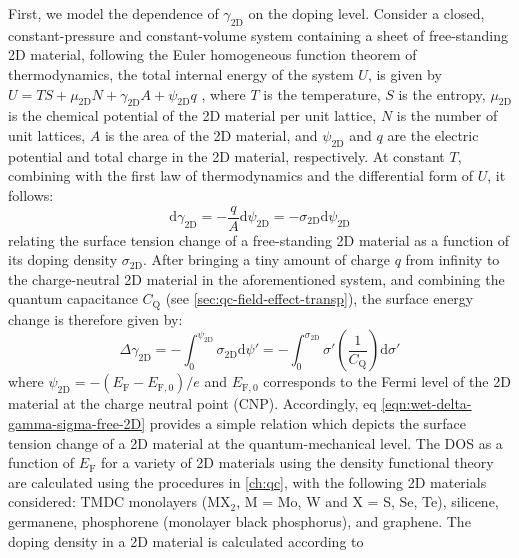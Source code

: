 First, we model the dependence of \(\gamma_{\mathrm{2D}}\) on the doping
level. Consider a closed, constant-pressure and constant-volume system
containing a sheet of free-standing 2D material, following the Euler
homogeneous function theorem of thermodynamics, the total internal
energy of the system \(U\), is given by \(U = TS + \mu_{\mathrm{2D}} N +
\gamma_{\mathrm{2D}} A + \psi_{\mathrm{2D}} q\)
\cite{Bard_1980_electrochem_book}, where \(T\) is the temperature, \(S\) is
the entropy, \(\mu_{\mathrm{2D}}\) is the chemical potential of the 2D
material per unit lattice, \(N\) is the number of unit lattices, \(A\) is
the area of the 2D material, and \(\psi_{\mathrm{2D}}\) and \(q\) are the
electric potential and total charge in the 2D material,
respectively. At constant \(T\), combining with the first law of
thermodynamics and the differential form of \(U\), it follows:
\begin{equation}
\label{eqn:wet-dgamma-dpsi}
\mathrm{d} \gamma_{\mathrm{2D}} = -\frac{q}{A} \mathrm{d} \psi_{\mathrm{2D}}
                                = -\sigma_{\mathrm{2D}} \mathrm{d} \psi_{\mathrm{2D}}
\end{equation}
relating the surface tension change of a free-standing 2D material as
a function of its doping density \(\sigma_{\mathrm{2D}}\).
%
After bringing a tiny amount of charge
\(q\) from infinity to the charge-neutral 2D material in the
aforementioned system, and combining the quantum capacitance $C_{\mathrm{Q}}$ (see \autoref{sec:qc-field-effect-transp}),
the surface energy change is therefore given
by:
\begin{equation}
\label{eqn:wet-delta-gamma-sigma-free-2D}
\Delta \gamma_{\mathrm{2D}} = - \int_{0}^{\psi_{\mathrm{2D}}} \sigma_{\mathrm{2D}} \mathrm{d}\psi'
                            = - \int_{0}^{\sigma_{\mathrm{2D}}} \sigma' \left( \frac{1}{C_{\mathrm{Q}}}\right) \mathrm{d} \sigma'
\end{equation}
where
\(\psi_{\mathrm{2D}} = -(E_{\mathrm{F}} - E_{\mathrm{F,0}})/e\) and
\(E_{\mathrm{F,0}}\) corresponds to the Fermi level of the 2D material
at the charge neutral point (CNP). Accordingly, eq
\autoref{eqn:wet-delta-gamma-sigma-free-2D} provides a simple relation which
depicts the surface tension change of a 2D material at the
quantum-mechanical level.
%
The DOS as a function of \(E_{\mathrm{F}}\) for a variety of 2D
materials using the density functional theory are calculated using the
procedures in \autoref{ch:qc}, with the following 2D
materials considered: TMDC monolayers (MX\(_{\text{2}}\), M = Mo,
W and X = S, Se, Te), silicene, germanene, phosphorene (monolayer
black phosphorus), and graphene.
The doping density in a 2D material
is calculated according to 

